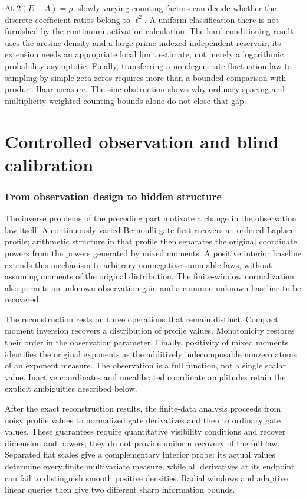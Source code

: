\documentclass[11pt,letterpaper]{article}
\theoremstyle{definition}
\theoremstyle{remark}
\newcommand{\1}{\mathbf 1}
\begin{document}
At $2(E-A)=\rho$, slowly varying counting factors can decide whether
the discrete coefficient ratios belong to $\ell^2$. A uniform
classification there is not furnished by the continuum activation
calculation. The hard-conditioning result uses the arcsine density
and a large prime-indexed independent reservoir; its extension needs
an appropriate local limit estimate, not merely a logarithmic
probability asymptotic. Finally, transferring a nondegenerate
fluctuation law to sampling by simple zeta zeros requires more than
a bounded comparison with product Haar measure. The sinc obstruction
shows why ordinary spacing and multiplicity-weighted counting bounds
alone do not close that gap.


\clearpage

\part{Controlled observation and blind calibration}
\label{part:controlled-observation}

\section{From observation design to hidden structure}
\label{p07:sec:introduction}The inverse problems of the preceding part motivate a change in the
observation law itself. A continuously varied Bernoulli gate first
recovers an ordered Laplace profile; arithmetic structure in that profile
then separates the original coordinate powers from the powers generated
by mixed moments. A positive interior baseline extends this mechanism to
arbitrary nonnegative summable laws, without assuming moments of the
original distribution. The finite-window normalization also permits an
unknown observation gain and a common unknown baseline to be recovered.

The reconstruction rests on three operations that remain distinct.
Compact moment inversion recovers a distribution of profile values.
Monotonicity restores their order in the observation parameter. Finally,
positivity of mixed moments identifies the original exponents as the
additively indecomposable nonzero atoms of an exponent measure. The
observation is a full function, not a single scalar value. Inactive
coordinates and uncalibrated coordinate amplitudes retain the explicit
ambiguities described below.

After the exact reconstruction results, the finite-data analysis proceeds
from noisy profile values to normalized gate derivatives and then to
ordinary gate values. These guarantees require quantitative visibility
conditions and recover dimension and powers; they do not provide uniform
recovery of the full law. Separated flat scales give a complementary
interior probe: its actual values determine every finite multivariate
measure, while all derivatives at its endpoint can fail to distinguish
smooth positive densities. Radial windows and adaptive linear queries
then give two different sharp information bounds.
\end{document}
